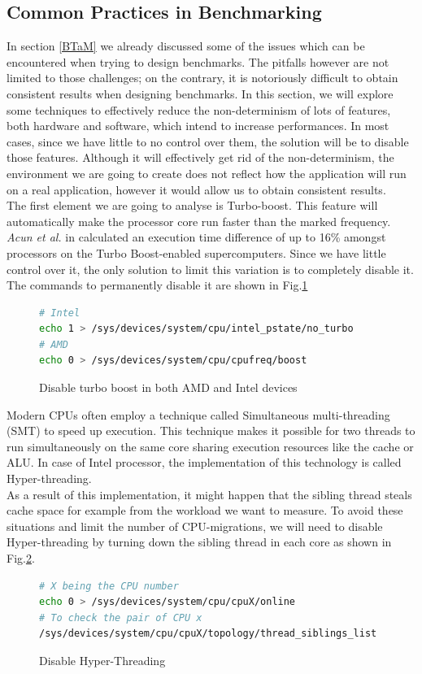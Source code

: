 \subsection{Common Practices in Benchmarking}\label{sec:ben_challenges} \label{sec:remove_inter}
In section \ref{BTaM} we already discussed some of the issues which can be encountered when trying to design benchmarks. The pitfalls however are not limited to those challenges; on the contrary, it is notoriously difficult to obtain consistent results when designing benchmarks. In this section, we will explore some techniques to effectively reduce the non-determinism of lots of features, both hardware and software, which intend to increase performances. In most cases, since we have little to no control over them, the solution will be to disable those features. Although it will effectively get rid of the non-determinism, the environment we are going to create does not reflect how the application will run on a real application, however it would allow us to obtain consistent results. \\
The first element we are going to analyse is Turbo-boost. This feature will automatically make the processor core run faster than the marked frequency. \textit{Acun et al.} in \cite{turbo_boost} calculated an execution time difference of up to 16\% amongst processors on the Turbo Boost-enabled supercomputers. Since we have little control over it, the only solution to limit this variation is to completely disable it. The commands to permanently disable it are shown in Fig.\ref{fig:no_boos}
\begin{figure}[h]
\begin{lstlisting}[language=bash]
# Intel
echo 1 > /sys/devices/system/cpu/intel_pstate/no_turbo
# AMD
echo 0 > /sys/devices/system/cpu/cpufreq/boost
\end{lstlisting}
\caption{Disable turbo boost in both AMD and Intel devices}
\label{fig:no_boos}
\end{figure}

Modern CPUs often employ a technique called Simultaneous multi-threading (SMT) to speed up execution. This technique makes it possible for two threads to run simultaneously on the same core sharing execution resources like the cache or ALU. In case of Intel processor, the implementation of this technology is called Hyper-threading.\\
As a result of this implementation, it might happen that the sibling thread steals cache space for example from the workload we want to measure. To avoid these situations and limit the number of CPU-migrations, we will need to disable Hyper-threading by turning down the sibling thread in each core as shown in Fig.\ref{fig:no_ht}. 
\begin{figure}[h]
\begin{lstlisting}[language=bash]
# X being the CPU number
echo 0 > /sys/devices/system/cpu/cpuX/online
# To check the pair of CPU x
/sys/devices/system/cpu/cpuX/topology/thread_siblings_list
\end{lstlisting}
\caption{Disable Hyper-Threading}
\label{fig:no_ht}
\end{figure}

